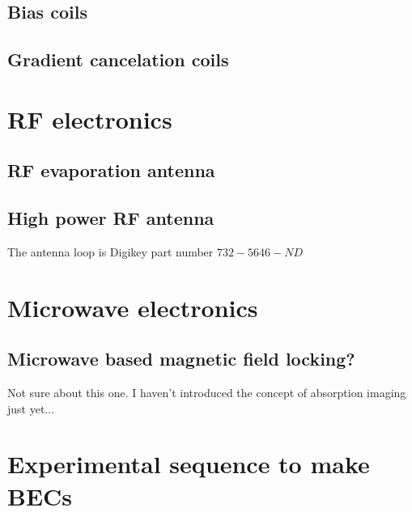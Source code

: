 \subsection{Bias coils}
\subsection{Gradient cancelation coils}

\section{RF electronics}
\subsection{RF evaporation antenna}
\subsection{High power RF antenna}
The antenna loop is Digikey part number $732-5646-ND$

\section{Microwave electronics}

\subsection{Microwave based magnetic field locking?}
Not sure about this one. I haven't introduced the concept of absorption imaging just yet...

\section{Experimental sequence to make BECs}











